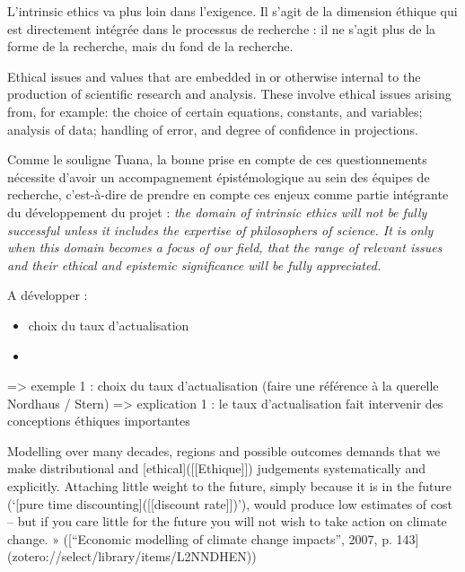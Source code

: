 L'\Gls{intrinsic ethics} va plus loin dans l'exigence. Il s'agit de la dimension éthique qui est directement intégrée dans le processus de recherche : il ne s'agit plus de la forme de la recherche, mais du fond de la recherche. 

\begin{displayquote}
Ethical issues and values that are embedded in or otherwise internal to the production of scientific research and analysis. These involve ethical issues arising from, for example: the choice of certain equations, constants, and variables; analysis of data; handling of error, and degree of confidence in projections.
\end{displayquote}
Comme le souligne Tuana, la bonne prise en compte de ces questionnements nécessite d'avoir un accompagnement épistémologique au sein des équipes de recherche, c'est-à-dire de prendre en compte ces enjeux comme partie intégrante du développement du projet : \emph{the domain of intrinsic ethics will not be fully successful unless it includes the expertise of philosophers of science. It is only when this domain becomes a focus of our field, that the range of relevant issues and their ethical and epistemic significance will be fully appreciated.} 

\begin{tcolorbox}
    A développer : 
    \begin{itemize}
        \item choix du taux d'actualisation
        \item 
    \end{itemize}
\end{tcolorbox}

=> exemple 1 : choix du taux d'actualisation (faire une référence à la querelle Nordhaus / Stern)
=> explication 1 : le taux d'actualisation fait intervenir des conceptions éthiques importantes

\begin{displayquote}
    Modelling over many decades, regions and possible outcomes demands that we make distributional and [ethical]([[Ethique]]) judgements systematically and explicitly. Attaching little weight to the future, simply because it is in the future (‘[pure time discounting]([[discount rate]])’), would produce low estimates of cost – but if you care little for the future you will not wish to take action on climate change. » ([“Economic modelling of climate change impacts”, 2007, p. 143](zotero://select/library/items/L2NNDHEN))
\end{displayquote}

